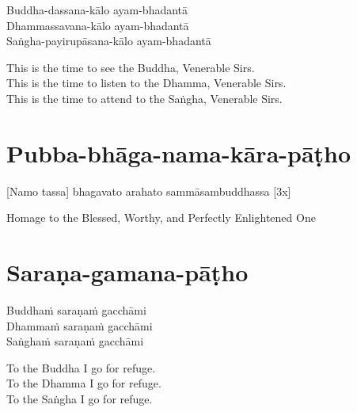 Buddha-dassana-kālo ayam-bhadantā\\
Dhammassavana-kālo ayam-bhadantā\hyperlink{endnote122-appendix}{\hypertarget{endnote122-body}{}}\\
Saṅgha-payirupāsana-kālo ayam-bhadantā\hyperlink{endnote123-appendix}{\hypertarget{endnote123-body}{}}

\begin{english-verses}
  This is the time to see the Buddha, Venerable Sirs.\\
  This is the time to listen to the Dhamma, Venerable Sirs.\\
  This is the time to attend to the Saṅgha, Venerable Sirs.
\end{english-verses}

\suttaRef{[Thai]}

\section{Pubba-bhāga-nama-kāra-pāṭho}
\label{pubba-bhaga-nama-kara-patho}

\vspace{-0.6em}

[Namo tassa] bhagavato arahato sammāsambuddhassa \hfill{[3x]}

\begin{english-verses}
  Homage to the Blessed, Worthy, and Perfectly Enlightened One
\end{english-verses}

\vspace{1em}

\section{Saraṇa-gamana-pāṭho}
\label{sarana-gamana-patho}

\vspace{-0.6em}

Buddhaṁ saraṇaṁ gacchāmi\\
Dhammaṁ saraṇaṁ gacchāmi\\
Saṅghaṁ saraṇaṁ gacchāmi

\begin{english-verses}
  To the Buddha I go for refuge.\\
  To the Dhamma I go for refuge.\\
  To the Saṅgha I go for refuge.
\end{english-verses}

